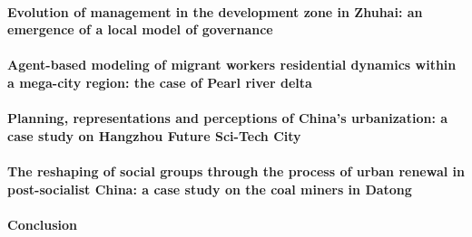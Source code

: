 \paragraph{Evolution of management in the development zone in Zhuhai: an emergence of a local model of governance}





\paragraph{Agent-based modeling of migrant workers residential dynamics within a mega-city region: the case of Pearl river delta}





\paragraph{Planning, representations and perceptions of China’s urbanization: a case study on Hangzhou Future Sci-Tech City}



\paragraph{The reshaping of social groups through the process of urban renewal in post-socialist China: a case study on the coal miners in Datong}





\paragraph{Conclusion}







\newpage








